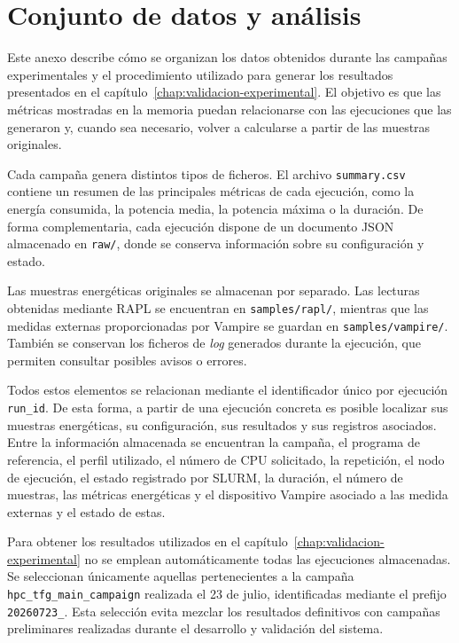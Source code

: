 \chapter{Conjunto de datos y análisis}
\label{anexo:dataset}

Este anexo describe cómo se organizan los datos obtenidos durante las campañas experimentales y el procedimiento utilizado para generar los resultados presentados en el capítulo~\ref{chap:validacion-experimental}. El objetivo es que las métricas mostradas en la memoria puedan relacionarse con las ejecuciones que las generaron y, cuando sea necesario, volver a calcularse a partir de las muestras originales.

Cada campaña genera distintos tipos de ficheros. El archivo \texttt{summary.csv} contiene un resumen de las principales métricas de cada ejecución, como la energía consumida, la potencia media, la potencia máxima o la duración. De forma complementaria, cada ejecución dispone de un documento JSON almacenado en \texttt{raw/}, donde se conserva información sobre su configuración y estado.

Las muestras energéticas originales se almacenan por separado. Las lecturas obtenidas mediante RAPL se encuentran en \texttt{samples/rapl/}, mientras que las medidas externas proporcionadas por Vampire se guardan en \texttt{samples/vampire/}. También se conservan los ficheros de \emph{log} generados durante la ejecución, que permiten consultar posibles avisos o errores.

Todos estos elementos se relacionan mediante el identificador único por ejecución \texttt{run\_id}. De esta forma, a partir de una ejecución concreta es posible localizar sus muestras energéticas, su configuración, sus resultados y sus registros asociados. Entre la información almacenada se encuentran la campaña, el programa de referencia, el perfil utilizado, el número de CPU solicitado, la repetición, el nodo de ejecución, el estado registrado por SLURM, la duración, el número de muestras, las métricas energéticas y el dispositivo Vampire asociado a las medida externas y el estado de estas.

Para obtener los resultados utilizados en el capítulo~\ref{chap:validacion-experimental} no se emplean automáticamente todas las ejecuciones almacenadas. Se seleccionan únicamente aquellas pertenecientes a la campaña \texttt{hpc\_tfg\_main\_campaign} realizada el 23 de julio, identificadas mediante el prefijo \texttt{20260723\_}. Esta selección evita mezclar los resultados definitivos con campañas preliminares realizadas durante el desarrollo y validación del sistema.

